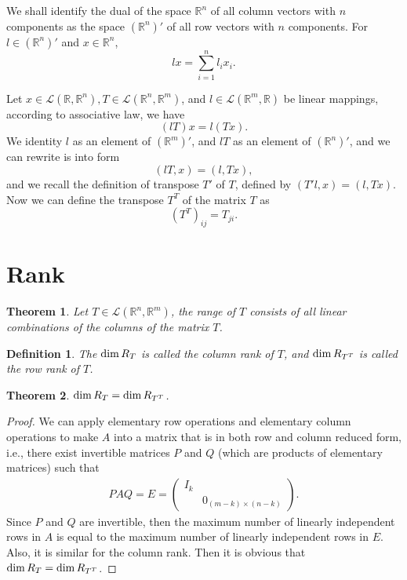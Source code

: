 \documentclass[11pt]{book}
\newtheorem{definition}{Definition}[chapter]
\newtheorem{theorem}{Theorem}[chapter]
\theoremstyle{definition}
\numberwithin{equation}{chapter}
\begin{document}
We shall identify the dual of the space $\mathbb{R}^n$ of all column vectors with $n$ components as the space $(\mathbb{R}^n)'$ of all row vectors with $n$ components. For $l\in (\mathbb{R}^n)'$ and $x\in\mathbb{R}^n$, 
$$l x = \sum^n_{i=1}l_ix_i.$$

Let $x\in\mathscr{L}(\mathbb{R},\mathbb{R}^n), T \in \mathscr{L}(\mathbb{R}^n,\mathbb{R}^m)$, and $l \in \mathscr{L}(\mathbb{R}^m,\mathbb{R})$ be linear mappings, according to associative law, we have
$$(lT)x = l(Tx).$$
We identity $l$ as an element of $(\mathbb{R}^m)'$, and $lT$ as an element of $(\mathbb{R}^n)'$, and we can rewrite is into form
$$(lT, x) = (l, Tx),$$
and we recall the definition of transpose $T'$ of $T$, defined by $(T'l, x) = (l, Tx)$. Now we can define the transpose $T^T$ of the matrix $T$ as 
$$\left(T^T\right)_{ij} = T_{ji}.$$

\medskip

\section{Rank}
\begin{theorem}
Let $T\in\mathscr{L}(\mathbb{R}^n,\mathbb{R}^m)$, the range of $T$ consists of all linear combinations of the columns of the matrix $T$.
\end{theorem}

\medskip

\begin{definition}
The ${\rm dim}\, R_T$ is called the column rank of $T$, and ${\rm dim}\, R_{T^T}$ is called the row rank of $T$.
\end{definition}

\begin{theorem}
${\rm dim}\,R_T = {\rm dim}\, R_{T^T}$.
\end{theorem}
\begin{proof}
We can apply elementary row operations and elementary column operations to make $A$ into a matrix that is in both row and column reduced form, i.e., there exist invertible matrices $P$ and $Q$ (which are products of elementary matrices) such that
\begin{align*}
    PAQ = E = \left(
        \begin{matrix}
        I_{k} &  \\
         & 0_{(m-k)\times (n-k)}
        \end{matrix}
    \right).
\end{align*}
Since $P$ and $Q$ are invertible, then the maximum number of linearly independent rows in $A$ is equal to the maximum number of linearly independent rows in $E$. Also, it is similar for the column rank. Then it is obvious that ${\rm dim}\,R_T = {\rm dim}\, R_{T^T}$.
\end{proof}
\end{document}
